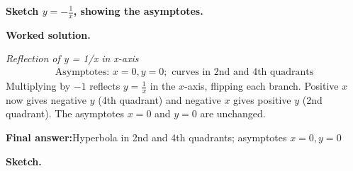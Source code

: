 \documentclass[11pt]{article}
\newcommand{\question}[1]{\par\medskip\noindent\textbf{#1}\par}
\begin{document}
\question{Sketch \( y = -\frac{1}{x} \), showing the asymptotes.}

\textbf{Worked solution.}

\textit{Reflection of y = 1/x in x-axis}
\[\begin{gathered}
\text{Asymptotes: } x = 0, y = 0; \text{ curves in 2nd and 4th quadrants}
\end{gathered}\]
Multiplying by \(-1\) reflects \( y = \tfrac{1}{x} \) in the \( x \)-axis, flipping each branch. Positive \( x \) now gives negative \( y \) (4th quadrant) and negative \( x \) gives positive \( y \) (2nd quadrant). The asymptotes \( x = 0 \) and \( y = 0 \) are unchanged.

\begin{answerbox}
\textbf{Final answer:}\quad Hyperbola in 2nd and 4th quadrants; asymptotes \(\displaystyle x = 0, y = 0\)
\end{answerbox}
\textbf{Sketch.}
\end{document}
